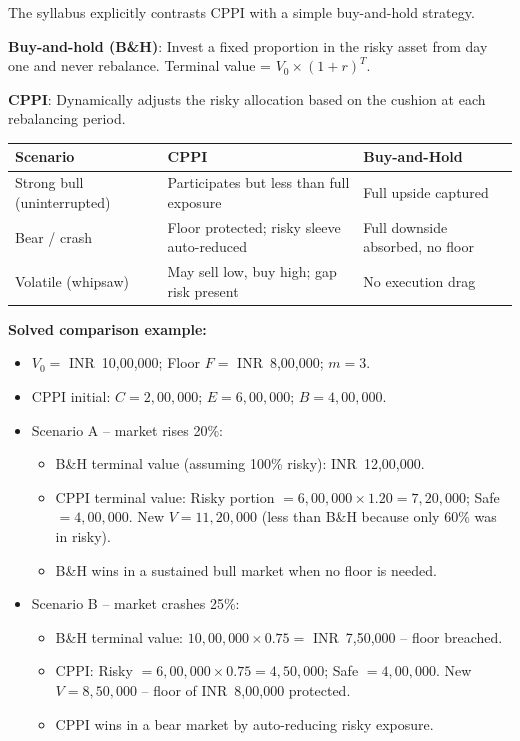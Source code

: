 \documentclass[
]{article}
\begin{document}
The syllabus explicitly contrasts CPPI with a simple buy-and-hold strategy.

\textbf{Buy-and-hold (B\&H)}: Invest a fixed proportion in the risky asset from day one and never rebalance. Terminal value = $V_0 \times (1+r)^T$.

\textbf{CPPI}: Dynamically adjusts the risky allocation based on the cushion at each rebalancing period.

\begin{center}
\begin{tabular}{|l|l|l|}
\hline
\textbf{Scenario} & \textbf{CPPI} & \textbf{Buy-and-Hold} \\
\hline
Strong bull (uninterrupted) & Participates but less than full exposure & Full upside captured \\
Bear / crash & Floor protected; risky sleeve auto-reduced & Full downside absorbed, no floor \\
Volatile (whipsaw) & May sell low, buy high; gap risk present & No execution drag \\
\hline
\end{tabular}
\end{center}

\textbf{Solved comparison example:}
\begin{itemize}
\item $V_0 = $ INR~10,00,000; Floor $F = $ INR~8,00,000; $m = 3$.
\item CPPI initial: $C = 2{,}00{,}000$; $E = 6{,}00{,}000$; $B = 4{,}00{,}000$.
\item Scenario A -- market rises 20\%:
  \begin{itemize}
    \item B\&H terminal value (assuming 100\% risky): INR~12,00,000.
    \item CPPI terminal value: Risky portion $= 6{,}00{,}000\times1.20 = 7{,}20{,}000$; Safe $= 4{,}00{,}000$. New $V = 11{,}20{,}000$ (less than B\&H because only 60\% was in risky).
    \item B\&H wins in a sustained bull market when no floor is needed.
  \end{itemize}
\item Scenario B -- market crashes 25\%:
  \begin{itemize}
    \item B\&H terminal value: $10{,}00{,}000\times0.75 = $ INR~7{,}50{,}000 -- floor breached.
    \item CPPI: Risky $= 6{,}00{,}000\times0.75 = 4{,}50{,}000$; Safe $= 4{,}00{,}000$. New $V = 8{,}50{,}000$ -- floor of INR~8,00,000 protected.
    \item CPPI wins in a bear market by auto-reducing risky exposure.
  \end{itemize}
\end{itemize}
\end{document}
